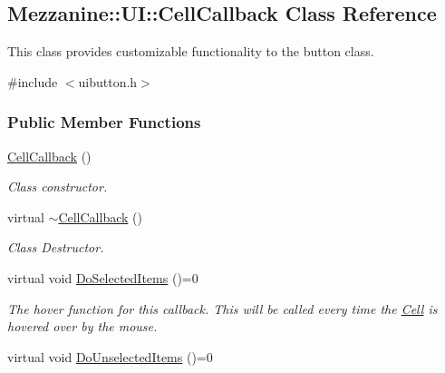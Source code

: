 \hypertarget{classMezzanine_1_1UI_1_1CellCallback}{
\subsection{Mezzanine::UI::CellCallback Class Reference}
\label{classMezzanine_1_1UI_1_1CellCallback}
}


This class provides customizable functionality to the button class.  




{\ttfamily \#include $<$uibutton.h$>$}

\subsubsection*{Public Member Functions}
\begin{DoxyCompactItemize}
\item 
\hypertarget{classMezzanine_1_1UI_1_1CellCallback_a56298f6efbe3124083d8202f9f9dfcdd}{
\hyperlink{classMezzanine_1_1UI_1_1CellCallback_a56298f6efbe3124083d8202f9f9dfcdd}{CellCallback} ()}
\label{classMezzanine_1_1UI_1_1CellCallback_a56298f6efbe3124083d8202f9f9dfcdd}

\begin{DoxyCompactList}\small\item\em Class constructor. \item\end{DoxyCompactList}\item 
\hypertarget{classMezzanine_1_1UI_1_1CellCallback_a3941fd4cf14ef8ed6b18474801a01863}{
virtual \hyperlink{classMezzanine_1_1UI_1_1CellCallback_a3941fd4cf14ef8ed6b18474801a01863}{$\sim$CellCallback} ()}
\label{classMezzanine_1_1UI_1_1CellCallback_a3941fd4cf14ef8ed6b18474801a01863}

\begin{DoxyCompactList}\small\item\em Class Destructor. \item\end{DoxyCompactList}\item 
\hypertarget{classMezzanine_1_1UI_1_1CellCallback_a0f05612d39cfc3161b16c9f30264b893}{
virtual void \hyperlink{classMezzanine_1_1UI_1_1CellCallback_a0f05612d39cfc3161b16c9f30264b893}{DoSelectedItems} ()=0}
\label{classMezzanine_1_1UI_1_1CellCallback_a0f05612d39cfc3161b16c9f30264b893}

\begin{DoxyCompactList}\small\item\em The hover function for this callback. This will be called every time the \hyperlink{classMezzanine_1_1UI_1_1Cell}{Cell} is hovered over by the mouse. \item\end{DoxyCompactList}\item 
\hypertarget{classMezzanine_1_1UI_1_1CellCallback_a9b34ee48e222767e8a06c8c8e131628c}{
virtual void \hyperlink{classMezzanine_1_1UI_1_1CellCallback_a9b34ee48e222767e8a06c8c8e131628c}{DoUnselectedItems} ()=0}
\label{classMezzanine_1_1UI_1_1CellCallback_a9b34ee48e222767e8a06c8c8e131628c}


\end{DoxyCompactItemize}

